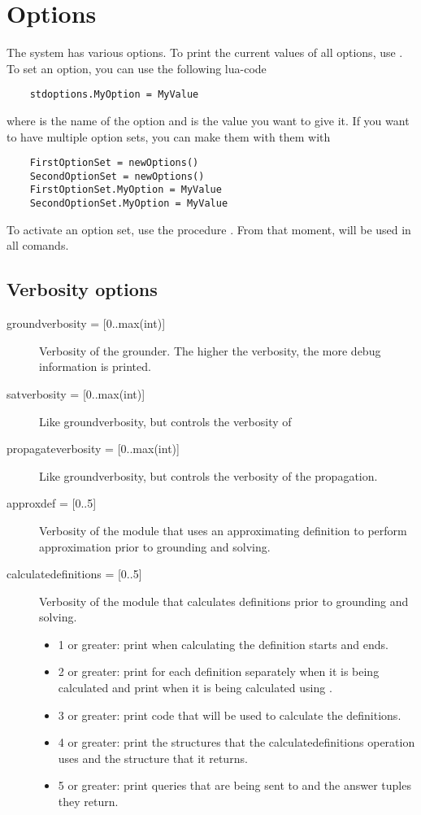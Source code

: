 \section{Options}
The \idp system has various options. To print the current values of all options, use .  To set an option, you can use the following lua-code
\begin{lstlisting}
	stdoptions.MyOption = MyValue
\end{lstlisting}
where  is the name of the option and  is the value you want to give it. If you want to have multiple option sets, you can make them with them with
\begin{lstlisting}
	FirstOptionSet = newOptions()
	SecondOptionSet = newOptions()
	FirstOptionSet.MyOption = MyValue
	SecondOptionSet.MyOption = MyValue
\end{lstlisting}
To activate an option set, use the procedure .  From that moment,  will be used in all comands.

\subsection{Verbosity options}
\begin{description}
	\item[{groundverbosity = [0..max(int)]}] Verbosity of the grounder.  The higher the verbosity, the more debug information is printed.
	\item[{satverbosity = [0..max(int)]}] Like groundverbosity, but controls the verbosity of \minisatid
	\item[{propagateverbosity = [0..max(int)]}] Like groundverbosity, but controls the verbosity of the propagation.
	\item[{approxdef = [0..5]}] Verbosity of the module that uses an approximating definition to perform approximation prior to grounding and solving. 
	\item[{calculatedefinitions = [0..5]}] Verbosity of the module that calculates definitions prior to grounding and solving. 
		\begin{itemize}
		\item 1 or greater: print when calculating the definition starts and ends.
		\item 2 or greater: print for each definition separately when it is being calculated and print when it is being calculated using \xsb.
		\item 3 or greater: print \xsb code that will be used to calculate the definitions.
		\item 4 or greater: print the structures that the calculatedefinitions operation uses and the structure that it returns.
		\item 5 or greater: print queries that are being sent to \xsb and the answer tuples they return.
		\end{itemize}
\end{description}

